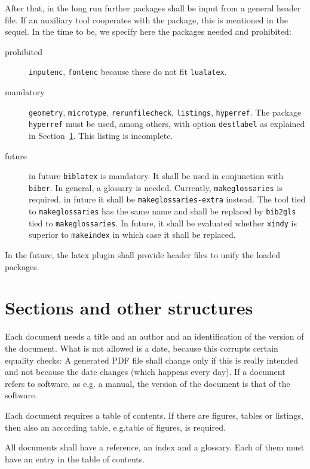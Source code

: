 \documentclass[a4paper,12pt]{article}
\begin{document}
After that, in the long run further packages shall be input from a general header file. 
If an auxiliary tool cooperates with the package, 
this is mentioned in the sequel. 
In the time to be, we specify here the packages needed and prohibited: 
%
\begin{description}
  \item[prohibited] 
  \texttt{inputenc}, 
  \texttt{fontenc} because these do not fit \texttt{lualatex}. 
  \item[mandatory] 
  \texttt{geometry}, \texttt{microtype}, \texttt{rerunfilecheck}, 
  \texttt{listings}, \texttt{hyperref}. 
  The package \texttt{hyperref} must be used, among others, with option \texttt{destlabel} 
  as explained in Section~\ref{sec:secs}. 
  This listing is incomplete. 
  \item[future] in future \texttt{biblatex} is mandatory. 
  It shall be used in conjunction with \texttt{biber}. 
  In general, a glossary is needed. Currently, \texttt{makeglossaries} is required, 
  in future it shall be \texttt{makeglossaries-extra} instead. 
  The tool tied to \texttt{makeglossaries} has the same name 
  and shall be replaced by \texttt{bib2gls} tied to \texttt{makeglossaries}. 
  In future, it shall be evaluated whether \texttt{xindy} is superior to \texttt{makeindex} 
  in which case it shall be replaced. 
\end{description}

In the future, the latex plugin shall provide header files to unify the loaded packages. 

\section{Sections and other structures}\label{sec:secs}

Each document needs a title and an author 
and an identification of the version of the document. 
What is not allowed is a date, because this corrupts certain equality checks: 
A generated PDF file shall change only 
if this is really intended and not because the date changes 
(which happens every day).  
If a document refers to software, as e.g\@. a manual, 
the version of the document is that of the software. 

Each document requires a table of contents. 
If there are figures, tables or listings, then also an according table, 
e.g.\@ table of figures, is required. 

All documents shall have a reference, an index and a glossary. 
Each of them must have an entry in the table of contents. 
\end{document}
